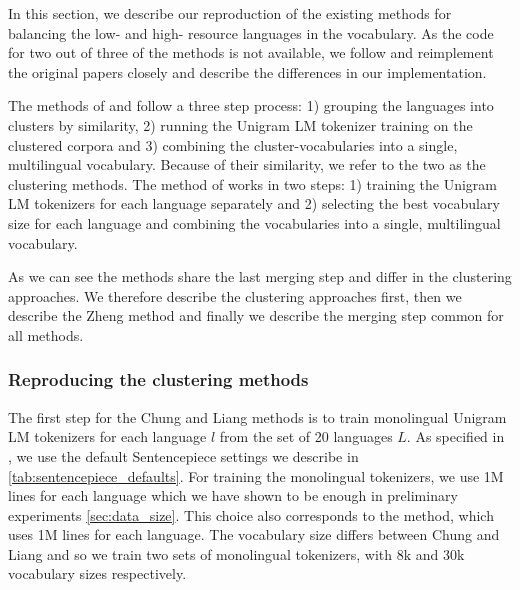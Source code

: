 
In this section, we describe our reproduction of the existing methods for balancing the low- and high- resource languages in the vocabulary. As the code for two out of three of the methods is not available, we follow and reimplement the original papers closely and describe the differences in our implementation.

The methods of \citet{chung_improving_2020} and \citet{liang_xlm-v_2023} follow a three step process: 1) grouping the languages into clusters by similarity, 2) running the Unigram LM tokenizer training on the clustered corpora and 3) combining the cluster-vocabularies into a single, multilingual vocabulary. Because of their similarity, we refer to the two as the clustering methods. The method of \citet{zheng_allocating_2021} works in two steps: 1) training the Unigram LM tokenizers for each language separately and 2) selecting the best vocabulary size for each language and combining the vocabularies into a single, multilingual vocabulary.

As we can see the methods share the last merging step and differ in the clustering approaches. We therefore describe the clustering approaches first, then we describe the Zheng method and finally we describe the merging step common for all methods.

\subsubsection{Reproducing the clustering methods}

The first step for the Chung and Liang methods is to train monolingual Unigram LM tokenizers for each language $l$ from the set of 20 languages $L$. As specified in \citet{chung_improving_2020}, we use the default Sentencepiece settings we describe in \autoref{tab:sentencepiece_defaults}.
For training the monolingual tokenizers, we use 1M lines for each language which we have shown to be enough in preliminary experiments \autoref{sec:data_size}. This choice also corresponds to the \citet{zheng_allocating_2021} method, which uses 1M lines for each language. The vocabulary size differs between Chung and Liang and so we train two sets of monolingual tokenizers, with 8k and 30k vocabulary sizes respectively.

